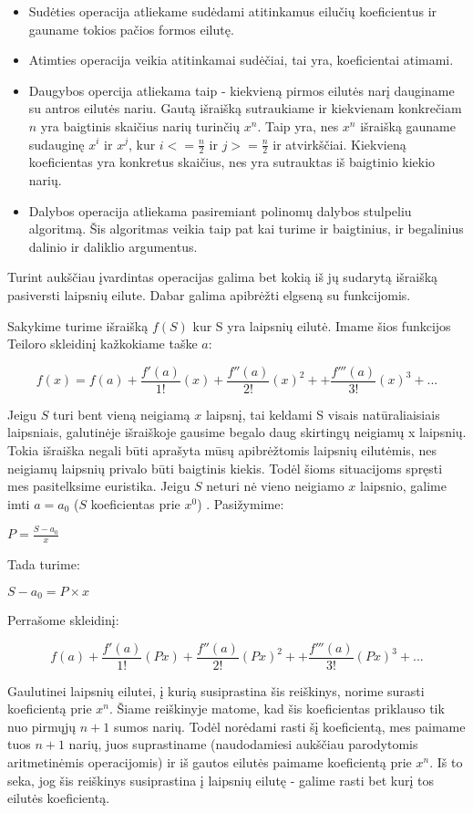 	\begin{itemize}
		\item Sudėties operacija atliekame sudėdami atitinkamus eilučių koeficientus ir gauname tokios pačios formos eilutę.
		\item Atimties operacija veikia atitinkamai sudėčiai, tai yra, koeficientai atimami.
		\item Daugybos opercija atliekama taip - kiekvieną pirmos eilutės narį dauginame su antros eilutės nariu.
			  Gautą išraišką sutraukiame ir kiekvienam konkrečiam $n$ yra baigtinis skaičius narių turinčių $x^n$.
			  Taip yra, nes $x^n$ išraišką gauname sudauginę $x^i$ ir $x^j$, kur $i <= \frac{n}{2}$ ir $j >= \frac{n}{2}$ ir atvirkščiai.
			  Kiekvieną koeficientas yra konkretus skaičius, nes yra sutrauktas iš baigtinio kiekio narių.
		\item Dalybos operacija atliekama pasiremiant polinomų dalybos stulpeliu algoritmą. 
			  Šis algoritmas veikia taip pat kai turime ir baigtinius, ir begalinius dalinio ir daliklio argumentus.
	\end{itemize}
	
	Turint aukščiau įvardintas operacijas galima bet kokią iš jų sudarytą išraišką pasiversti laipsnių eilute.
	Dabar galima apibrėžti elgseną su funkcijomis.
	
	Sakykime turime išraišką $f(S)$ kur S yra laipsnių eilutė. 
	Imame šios funkcijos Teiloro skleidinį kažkokiame taške $a$: 
	
	\[f(x) = f(a) + \frac{f'(a)}{1!}(x)+\frac{f''(a)}{2!}(x)^2 + +\frac{f'''(a)}{3!}(x)^3 + ...\]
	
	Jeigu $S$ turi bent vieną neigiamą $x$ laipsnį, tai keldami S visais natūraliaisiais laipsniais, galutinėje išraiškoje gausime begalo daug skirtingų neigiamų x laipsnių.
	Tokia išraiška negali būti aprašyta mūsų apibrėžtomis laipsnių eilutėmis, nes neigiamų laipsnių privalo būti baigtinis kiekis. 
	Todėl šioms situacijoms spręsti mes pasitelksime euristika.
	Jeigu $S$ neturi nė vieno neigiamo $x$ laipsnio, galime imti $a = a_0$ ($S$ koeficientas prie $x^0$) .
	Pasižymime:
	
	$P = \frac{S - a_0}{x}$
	
	Tada turime: 
	
	$S - a_0 = P \times x$
	
	Perrašome skleidinį:
	
	\[f(a) + \frac{f'(a)}{1!}(Px)+\frac{f''(a)}{2!}(Px)^2 + +\frac{f'''(a)}{3!}(Px)^3 + ...\]
	
	Gaulutinei laipsnių eilutei, į kurią susiprastina šis reiškinys, norime surasti koeficientą prie $x^n$. 
	Šiame reiškinyje matome, kad šis koeficientas priklauso tik nuo pirmųjų $n+1$ sumos narių. 
	Todėl norėdami rasti šį koeficientą, mes paimame tuos $n+1$ narių, juos suprastiname (naudodamiesi aukščiau parodytomis aritmetinėmis operacijomis) 
	ir iš gautos eilutės paimame koeficientą prie $x^n$. 
	Iš to seka, jog šis reiškinys susiprastina į laipsnių eilutę - galime rasti bet kurį tos eilutės koeficientą.
	

